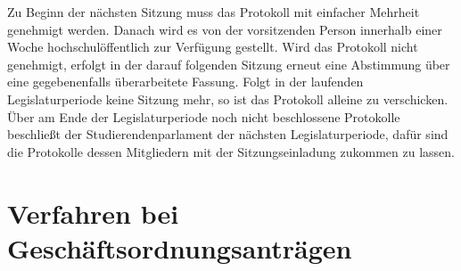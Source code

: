 \documentclass[10pt,a4paper]{scrartcl}
\begin{document}
\begin{contract}
Zu Beginn der nächsten Sitzung muss das Protokoll mit einfacher
Mehrheit genehmigt werden. Danach wird es von der vorsitzenden Person
innerhalb einer Woche hochschulöffentlich zur Verfügung gestellt. Wird
das Protokoll nicht genehmigt, erfolgt in der darauf folgenden Sitzung
erneut eine Abstimmung über eine gegebenenfalls überarbeitete Fassung.
Folgt in der laufenden Legislaturperiode keine Sitzung
mehr, so ist das Protokoll alleine zu verschicken. Über am Ende der
Legislaturperiode noch nicht beschlossene Protokolle beschließt der
Studierendenparlament der nächsten Legislaturperiode, dafür sind die
Protokolle dessen Mitgliedern mit der Sitzungseinladung zukommen zu
lassen.

\end{contract}


\section{Verfahren bei
Geschäftsordnungsanträgen}\label{verfahren-bei-geschuxe4ftsordnungsantruxe4gen}
\end{document}

